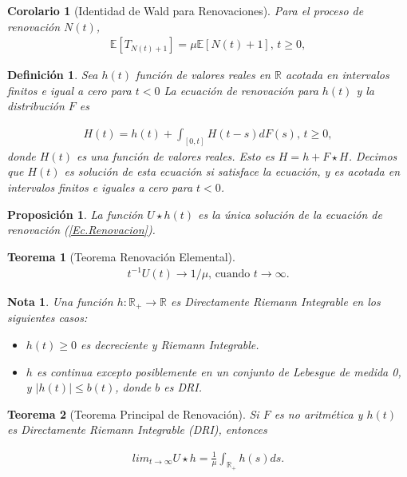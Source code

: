 \documentclass{article}
\newtheorem{Def}{Definición}
\newtheorem{Teo}{Teorema}
\newtheorem{Note}{Nota}
\newtheorem{Prop}{Proposición}
\newtheorem{Coro}{Corolario}
\newcommand{\rea}{\mathbb{R}}
\newcommand{\esp}{\mathbb{E}}
\begin{document}
\begin{Coro}[Identidad de Wald para Renovaciones]
Para el proceso de renovaci\'on $N\left(t\right)$,
\begin{eqnarray*}
\esp\left[T_{N\left(t\right)+1}\right]=\mu\esp\left[N\left(t\right)+1\right]\textrm{,  }t\geq0,
\end{eqnarray*}  
\end{Coro}


\begin{Def}
Sea $h\left(t\right)$ funci\'on de valores reales en $\rea$ acotada en intervalos finitos e igual a cero para $t<0$ La ecuaci\'on de renovaci\'on para $h\left(t\right)$ y la distribuci\'on $F$ es

\begin{eqnarray}\label{Ec.Renovacion}
H\left(t\right)=h\left(t\right)+\int_{\left[0,t\right]}H\left(t-s\right)dF\left(s\right)\textrm{,    }t\geq0,
\end{eqnarray}
donde $H\left(t\right)$ es una funci\'on de valores reales. Esto es $H=h+F\star H$. Decimos que $H\left(t\right)$ es soluci\'on de esta ecuaci\'on si satisface la ecuaci\'on, y es acotada en intervalos finitos e iguales a cero para $t<0$.
\end{Def}

\begin{Prop}
La funci\'on $U\star h\left(t\right)$ es la \'unica soluci\'on de la ecuaci\'on de renovaci\'on (\ref{Ec.Renovacion}).
\end{Prop}

\begin{Teo}[Teorema Renovaci\'on Elemental]
\begin{eqnarray*}
t^{-1}U\left(t\right)\rightarrow 1/\mu\textrm{,    cuando }t\rightarrow\infty.
\end{eqnarray*}
\end{Teo}


\begin{Note} Una funci\'on $h:\rea_{+}\rightarrow\rea$ es Directamente Riemann Integrable en los siguientes casos:
\begin{itemize}
\item[a)] $h\left(t\right)\geq0$ es decreciente y Riemann Integrable.
\item[b)] $h$ es continua excepto posiblemente en un conjunto de Lebesgue de medida 0, y $|h\left(t\right)|\leq b\left(t\right)$, donde $b$ es DRI.
\end{itemize}
\end{Note}

\begin{Teo}[Teorema Principal de Renovaci\'on]
Si $F$ es no aritm\'etica y $h\left(t\right)$ es Directamente Riemann Integrable (DRI), entonces

\begin{eqnarray*}
lim_{t\rightarrow\infty}U\star h=\frac{1}{\mu}\int_{\rea_{+}}h\left(s\right)ds.
\end{eqnarray*}
\end{Teo}
\end{document}

